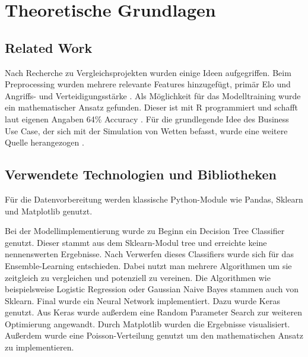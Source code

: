\chapter{Theoretische Grundlagen}

\section{Related Work}
Nach Recherche zu Vergleichsprojekten wurden einige Ideen aufgegriffen. Beim Preprocessing wurden mehrere relevante Features hinzugefügt, primär Elo und Angriffs- und Verteidigungsstärke \autocite[Vgl.][]{Accso.14102021}. Als Möglichkeit für das Modelltraining wurde ein mathematischer Ansatz gefunden. Dieser ist mit R programmiert und schafft laut eigenen Angaben 64\% Accuracy \autocite[Vgl.][]{Doan.}. Für die grundlegende Idee des Business Use Case, der sich mit der Simulation von Wetten befasst, wurde eine weitere Quelle herangezogen \autocite[Vgl.][]{Hartley.05102022}.

\section{Verwendete Technologien und Bibliotheken}
Für die Datenvorbereitung werden klassische Python-Module wie Pandas, Sklearn und Matplotlib genutzt.

Bei der Modellimplementierung wurde zu Beginn ein Decision Tree Classifier genutzt. Dieser stammt aus dem Sklearn-Modul tree und erreichte keine nennenswerten Ergebnisse. Nach Verwerfen dieses Classifiers wurde sich für das Ensemble-Learning entschieden. Dabei nutzt man mehrere Algorithmen um sie zeitgleich zu vergleichen und potenziell zu vereinen. Die Algorithmen wie beispielsweise Logistic Regression oder Gaussian Naive Bayes stammen auch von Sklearn. Final wurde ein Neural Network implementiert. Dazu wurde Keras genutzt. Aus Keras wurde außerdem eine Random Parameter Search zur weiteren Optimierung angewandt. Durch Matplotlib wurden die Ergebnisse visualisiert. Außerdem wurde eine Poisson-Verteilung genutzt um den mathematischen Ansatz zu implementieren.
